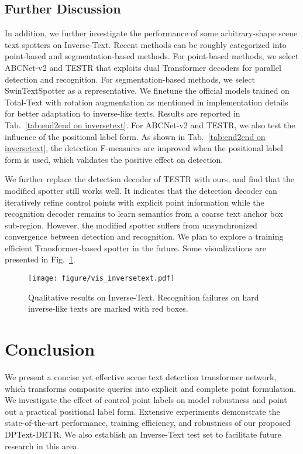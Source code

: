 \documentclass[letterpaper]{article} \usepackage{aaai23}  \usepackage{times}  \usepackage{helvet}  \usepackage{courier}  \usepackage[hyphens]{url}  \usepackage{graphicx} \urlstyle{rm}
\begin{document}
\subsection{Further Discussion}
\label{sec:further discussion}
In addition, we further investigate the performance of some arbitrary-shape scene text spotters on Inverse-Text. Recent methods can be roughly categorized into point-based and segmentation-based methods. For point-based methods, we select ABCNet-v2 \cite{9525302} and TESTR \cite{zhang2022text} that exploits dual Transformer decoders for parallel detection and recognition. For segmentation-based methods, we select SwinTextSpotter \cite{huang2022swintextspotter} as a representative. We finetune the official models trained on Total-Text with rotation augmentation as mentioned in implementation details for better adaptation to inverse-like texts. Results are reported in Tab.~\ref{tab:end2end on inversetext}. For ABCNet-v2 and TESTR, we also test the influence of the positional label form. As shown in Tab.~\ref{tab:end2end on inversetext}, the detection F-measures are improved when the positional label form is used, which validates the positive effect on detection. 

We further replace the detection decoder of TESTR with ours, and find that the modified spotter still works well. It indicates that the detection decoder can iteratively refine control points with explicit point information while the recognition decoder remains to learn semantics from a coarse text anchor box sub-region. However, the modified spotter suffers from unsynchronized convergence between detection and recognition. We plan to explore a training efficient Transformer-based spotter in the future. Some visualizations are presented in Fig.~\ref{fig:vis_inversetext}.

\begin{figure}[!]
    \centering
    \texttt{[image: figure/vis\_inversetext.pdf]}
    \caption{Qualitative results on Inverse-Text. Recognition failures on hard inverse-like texts are marked with red boxes.}
    \label{fig:vis_inversetext}
\end{figure}


\section{Conclusion}
We present a concise yet effective scene text detection transformer network, which transforms composite queries into explicit and complete point formulation. We investigate the effect of control point labels on model robustness and point out a practical positional label form. Extensive experiments demonstrate the state-of-the-art performance, training efficiency, and robustness of our proposed DPText-DETR. We also establish an Inverse-Text test set to facilitate future research in this area.
\end{document}
